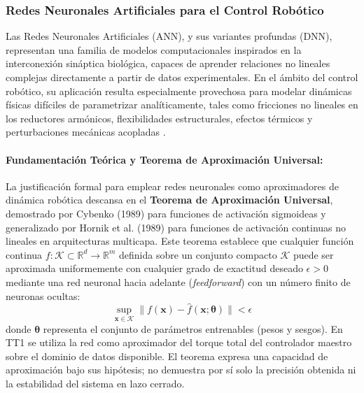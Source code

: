 \documentclass[12pt]{article}
\begin{document}
\subsubsection{Redes Neuronales Artificiales para el Control Robótico}
\label{ssec:ann_control_robotico}
Las Redes Neuronales Artificiales (ANN), y sus variantes profundas (DNN), representan una familia de modelos computacionales inspirados en la interconexión sináptica biológica, capaces de aprender relaciones no lineales complejas directamente a partir de datos experimentales. En el ámbito del control robótico, su aplicación resulta especialmente provechosa para modelar dinámicas físicas difíciles de parametrizar analíticamente, tales como fricciones no lineales en los reductores armónicos, flexibilidades estructurales, efectos térmicos y perturbaciones mecánicas acopladas \cite{Park2025electronics, Zanatta2024exploring}.

\paragraph{Fundamentación Teórica y Teorema de Aproximación Universal:}
La justificación formal para emplear redes neuronales como aproximadores de dinámica robótica descansa en el \textbf{Teorema de Aproximación Universal}, demostrado por Cybenko (1989) \cite{cybenko1989approximation} para funciones de activación sigmoideas y generalizado por Hornik et al. (1989) \cite{hornik1989multilayer} para funciones de activación continuas no lineales en arquitecturas multicapa. Este teorema establece que cualquier función continua $f: \mathcal{K} \subset \mathbb{R}^d \to \mathbb{R}^m$ definida sobre un conjunto compacto $\mathcal{K}$ puede ser aproximada uniformemente con cualquier grado de exactitud deseado $\epsilon > 0$ mediante una red neuronal hacia adelante (\textit{feedforward}) con un número finito de neuronas ocultas:
\begin{equation}
\sup_{\bm{x} \in \mathcal{K}} \| f(\bm{x}) - \hat{f}(\bm{x}; \bm{\theta}) \| < \epsilon
\label{eq:universal_approximation}
\end{equation}
donde $\bm{\theta}$ representa el conjunto de parámetros entrenables (pesos y sesgos). En TT1 se utiliza la red como aproximador del torque total del controlador maestro sobre el dominio de datos disponible. El teorema expresa una capacidad de aproximación bajo sus hipótesis; no demuestra por sí solo la precisión obtenida ni la estabilidad del sistema en lazo cerrado.
\end{document}

